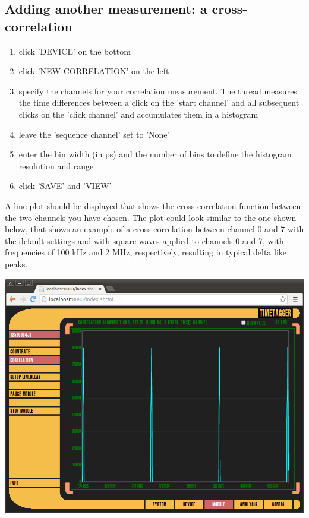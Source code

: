 \documentclass[oneside]{memoir}
\begin{document}
\subsection{Adding another measurement: a cross-correlation}

\begin{enumerate}
 \item click 'DEVICE' on the bottom
 \item click 'NEW CORRELATION' on the left
 \item specify the channels for your correlation measurement. The thread measures the time differences between a
click on the 'start channel' and all subsequent clicks on the 'click channel' and accumulates them in a histogram
 \item leave the 'sequence channel' set to 'None'
 \item enter the bin width (in ps) and the number of bins to define the histogram resolution and range
 \item click 'SAVE' and 'VIEW'
\end{enumerate}
A line plot should be displayed that shows the cross-correlation function between the two channels you have chosen. The
plot could look similar to the one shown below, that shows an example of a cross correlation between channel 0 and 7
with the default settings and with square waves applied to channels 0 and 7, with frequencies of 100 kHz and 2 MHz,
respectively, resulting in typical delta like peaks.
\begin{center}
\includegraphics[scale=0.4]{figures/crosscorrelation.png}
\end{center}
\end{document}
